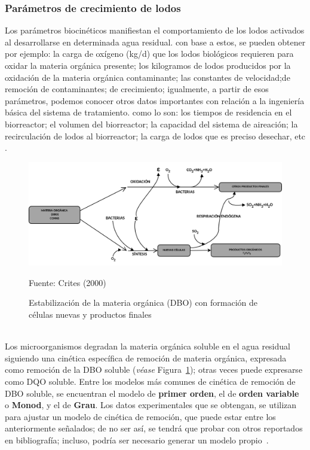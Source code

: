 \subsubsection*{Parámetros de crecimiento de lodos}
Los parámetros biocinéticos manifiestan el comportamiento de los lodos activados al desarrollarse en determinada agua residual. con base a estos, se pueden obtener por ejemplo: la carga de oxígeno (kg/d) que los lodos biológicos requieren para oxidar la materia orgánica presente; los kilogramos de lodos producidos por la oxidación de la materia orgánica contaminante; las constantes de velocidad;de remoción de contaminantes; de crecimiento; igualmente, a partir de esos parámetros, podemos conocer otros datos importantes con relación a la ingeniería básica del sistema de tratamiento. como lo son: los tiempos de residencia en el biorreactor; el volumen del biorreactor; la capacidad del sistema de aireación; la recirculación de lodos al biorreactor; la carga de lodos que es preciso desechar, etc \emph{\citep{martinez2005}}.
	\begin{figure}[!h]
		\begin{center}
		\includegraphics[scale=0.25]{Estabilizacion_mat_org.png}
		\caption{Estabilización de la materia orgánica (DBO) con formación de células nuevas y productos finales}
		\small{Fuente: Crites (2000)}
		\label{fig:estabilizacion}
		\end{center}
	\end{figure}
\\Los microorganismos degradan la materia orgánica soluble en el agua residual siguiendo una cinética específica de remoción de materia orgánica, expresada como remoción de la DBO soluble (\emph{véase} Figura~\ref{fig:estabilizacion}); otras veces puede expresarse como DQO soluble. Entre los modelos más comunes de cinética de remoción de DBO soluble, se encuentran el modelo de \textbf{primer orden}, el de \textbf{orden variable} o \textbf{Monod}, y el de \textbf{Grau}. Los datos experimentales que se obtengan, se utilizan para ajustar un modelo de cinética de remoción, que puede estar entre los anteriormente señalados; de no ser así, se tendrá que probar con otros reportados en bibliografía; incluso, podría ser necesario generar un modelo propio~\emph{\citep{martinez2005}}.\\
